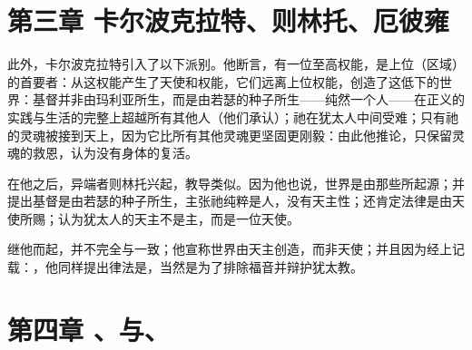 
\section{第三章 卡尔波克拉特、则林托、厄彼雍}

此外，卡尔波克拉特引入了以下派别。他断言，有一位至高权能，是上位（区域）的首要者：从这权能产生了天使和权能，它们远离上位权能，创造了这低下的世界：基督并非由玛利亚所生，而是由若瑟的种子所生——纯然一个人——在正义的实践与生活的完整上超越所有其他人（他们承认）；祂在犹太人中间受难；只有祂的灵魂被接到天上，因为它比所有其他灵魂更坚固更刚毅：由此他推论，只保留灵魂的救恩，认为没有身体的复活。\par

在他之后，异端者则林托兴起，教导类似。因为他也说，世界是由那些所起源；并提出基督是由若瑟的种子所生，主张祂纯粹是人，没有天主性；还肯定法律是由天使所赐；认为犹太人的天主不是主，而是一位天使。\par

继他而起，并不完全与一致；他宣称世界由天主创造，而非天使；并且因为经上记载：，他同样提出律法是，当然是为了排除福音并辩护犹太教。\par


\section{第四章 、与、}

